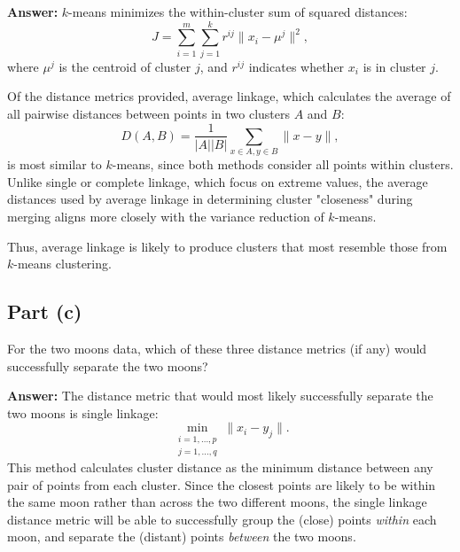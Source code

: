 \documentclass{article}
\begin{document}
\textbf{Answer:}
\(k\)-means minimizes the within-cluster sum of squared distances:
$$J = \sum_{i=1}^m \sum_{j=1}^k r^{ij} \|x_i - \mu^j\|^2,$$
where \( \mu^j \) is the centroid of cluster \( j \), and \( r^{ij} \) indicates whether \( x_i \) is in cluster \( j \).

Of the distance metrics provided, average linkage, which calculates the average of all pairwise distances between points in two clusters \( A \) and \( B \):
$$D(A,B) = \frac{1}{|A||B|} \sum_{x \in A, y \in B} \|x - y\|,$$
is most similar to \( k\)-means, since both methods consider all points within clusters.
Unlike single or complete linkage, which focus on extreme values, the average distances used by average linkage in determining cluster "closeness" during merging aligns more closely with the variance reduction of \( k\)-means.

Thus, average linkage is likely to produce clusters that most resemble those from \( k\)-means clustering.

\subsection{Part (c)}
For the two moons data, which of these three distance metrics (if any) would successfully separate the two moons?

\textbf{Answer:} The distance metric that would most likely successfully separate the two moons is single linkage:
$$\min_{\substack{i=1,\dots,p\\j=1,\dots,q}} \|x_i - y_j\|.$$
This method calculates cluster distance as the minimum distance between any pair of points from each cluster.
Since the closest points are likely to be within the same moon rather than across the two different moons, the single linkage distance metric will be able to successfully group the (close) points \textit{within} each moon, and separate the (distant) points \textit{between} the two moons.
\end{document}
